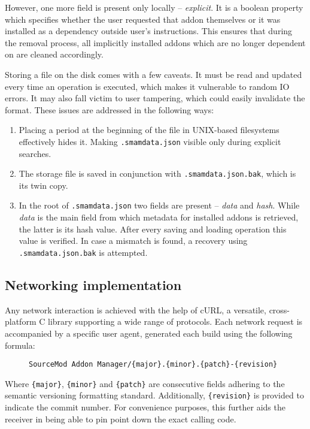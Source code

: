 However, one more field is present only locally -- \textit{explicit}.
It is a boolean property which specifies whether the user requested that addon themselves or it was installed as a dependency outside user's instructions.
This ensures that during the removal process, all implicitly installed addons which are no longer dependent on are cleaned accordingly.

Storing a file on the disk comes with a few caveats.
It must be read and updated every time an operation is executed, which makes it vulnerable to random IO errors.
It may also fall victim to user tampering, which could easily invalidate the format.
These issues are addressed in the following ways:
\begin{enumerate}
\item
Placing a period at the beginning of the file in UNIX-based filesystems effectively hides it.
Making \verb|.smamdata.json| visible only during explicit searches.
\item
The storage file is saved in conjunction with \verb|.smamdata.json.bak|, which is its twin copy.
\item
In the root of \verb|.smamdata.json| two fields are present -- \textit{data} and \textit{hash}.
While \textit{data} is the main field from which metadata for installed addons is retrieved, the latter is its hash value.
After every saving and loading operation this value is verified.
In case a mismatch is found, a recovery using \verb|.smamdata.json.bak| is attempted.
\end{enumerate}

\subsection{Networking implementation}

Any network interaction is achieved with the help of cURL, a versatile, cross-platform C library supporting a wide range of protocols.
Each network request is accompanied by a specific user agent, generated each build using the following formula:

\begin{figure}[htp]
\centering
\verb|SourceMod Addon Manager/{major}.{minor}.{patch}-{revision}|
\end{figure}
Where \verb|{major}|, \verb|{minor}| and \verb|{patch}| are consecutive fields adhering to the semantic versioning formatting standard.
Additionally, \verb|{revision}| is provided to indicate the commit number.
For convenience purposes, this further aids the receiver in being able to pin point down the exact calling code.


